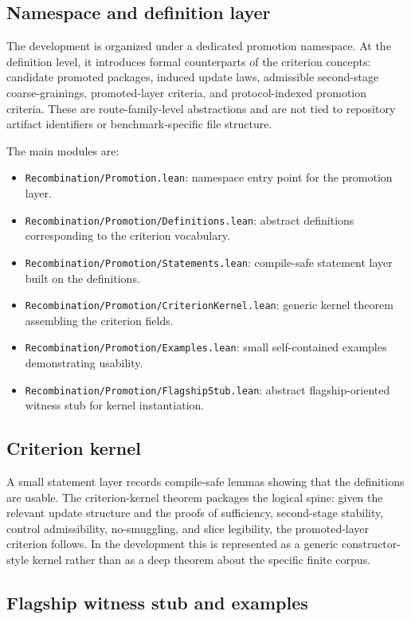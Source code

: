 \documentclass[11pt]{article}
\theoremstyle{definition}
\begin{document}
\subsection{Namespace and definition layer}

The development is organized under a dedicated promotion namespace. At the definition level, it introduces formal counterparts of the criterion concepts: candidate promoted packages, induced update laws, admissible second-stage coarse-grainings, promoted-layer criteria, and protocol-indexed promotion criteria. These are route-family-level abstractions and are not tied to repository artifact identifiers or benchmark-specific file structure.

The main modules are:
\begin{itemize}
\item \texttt{Recombination/Promotion.lean}: namespace entry point for the promotion layer.
\item \texttt{Recombination/Promotion/Definitions.lean}: abstract definitions corresponding to the criterion vocabulary.
\item \texttt{Recombination/Promotion/Statements.lean}: compile-safe statement layer built on the definitions.
\item \texttt{Recombination/Promotion/CriterionKernel.lean}: generic kernel theorem assembling the criterion fields.
\item \texttt{Recombination/Promotion/Examples.lean}: small self-contained examples demonstrating usability.
\item \texttt{Recombination/Promotion/FlagshipStub.lean}: abstract flagship-oriented witness stub for kernel instantiation.
\end{itemize}

\subsection{Criterion kernel}

A small statement layer records compile-safe lemmas showing that the definitions are usable. The criterion-kernel theorem packages the logical spine: given the relevant update structure and the proofs of sufficiency, second-stage stability, control admissibility, no-smuggling, and slice legibility, the promoted-layer criterion follows. In the development this is represented as a generic constructor-style kernel rather than as a deep theorem about the specific finite corpus.

\subsection{Flagship witness stub and examples}
\end{document}
